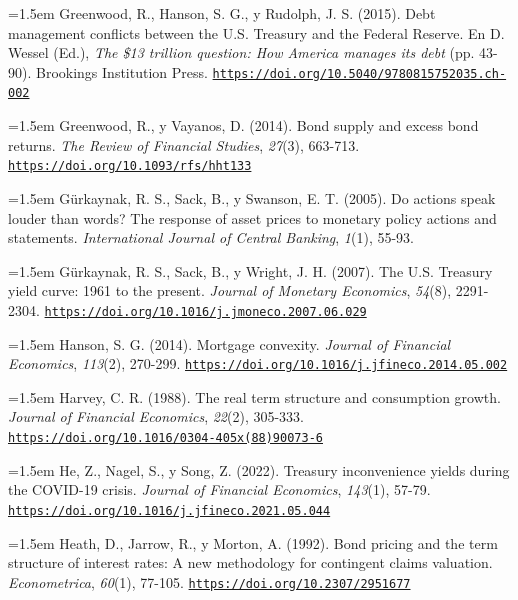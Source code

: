 \documentclass[10pt,a4paper]{article}
\begin{document}
\noindent\hangindent=1.5em Greenwood, R., Hanson, S. G., y Rudolph, J. S. (2015). Debt management conflicts between the U.S. Treasury and the Federal Reserve. En D. Wessel (Ed.), \textit{The \$13 trillion question: How America manages its debt} (pp. 43-90). Brookings Institution Press. \href{https://doi.org/10.5040/9780815752035.ch-002}{\nolinkurl{https://doi.org/10.5040/9780815752035.ch-002}}

\noindent\hangindent=1.5em Greenwood, R., y Vayanos, D. (2014). Bond supply and excess bond returns. \textit{The Review of Financial Studies}, \textit{27}(3), 663-713. \href{https://doi.org/10.1093/rfs/hht133}{\nolinkurl{https://doi.org/10.1093/rfs/hht133}}

\noindent\hangindent=1.5em Gürkaynak, R. S., Sack, B., y Swanson, E. T. (2005). Do actions speak louder than words? The response of asset prices to monetary policy actions and statements. \textit{International Journal of Central Banking}, \textit{1}(1), 55-93.

\noindent\hangindent=1.5em Gürkaynak, R. S., Sack, B., y Wright, J. H. (2007). The U.S. Treasury yield curve: 1961 to the present. \textit{Journal of Monetary Economics}, \textit{54}(8), 2291-2304. \href{https://doi.org/10.1016/j.jmoneco.2007.06.029}{\nolinkurl{https://doi.org/10.1016/j.jmoneco.2007.06.029}}

\noindent\hangindent=1.5em Hanson, S. G. (2014). Mortgage convexity. \textit{Journal of Financial Economics}, \textit{113}(2), 270-299. \href{https://doi.org/10.1016/j.jfineco.2014.05.002}{\nolinkurl{https://doi.org/10.1016/j.jfineco.2014.05.002}}

\noindent\hangindent=1.5em Harvey, C. R. (1988). The real term structure and consumption growth. \textit{Journal of Financial Economics}, \textit{22}(2), 305-333. \href{https://doi.org/10.1016/0304-405x(88)90073-6}{\nolinkurl{https://doi.org/10.1016/0304-405x(88)90073-6}}

\noindent\hangindent=1.5em He, Z., Nagel, S., y Song, Z. (2022). Treasury inconvenience yields during the COVID-19 crisis. \textit{Journal of Financial Economics}, \textit{143}(1), 57-79. \href{https://doi.org/10.1016/j.jfineco.2021.05.044}{\nolinkurl{https://doi.org/10.1016/j.jfineco.2021.05.044}}

\noindent\hangindent=1.5em Heath, D., Jarrow, R., y Morton, A. (1992). Bond pricing and the term structure of interest rates: A new methodology for contingent claims valuation. \textit{Econometrica}, \textit{60}(1), 77-105. \href{https://doi.org/10.2307/2951677}{\nolinkurl{https://doi.org/10.2307/2951677}}
\end{document}
